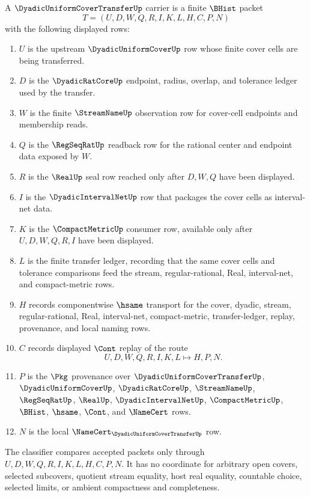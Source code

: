 \begin{definition}
\label{def:dyadic-uniform-cover-transfer-carrier}
A $\DyadicUniformCoverTransferUp$ carrier is a finite $\BHist$ packet
$$
T=(U,D,W,Q,R,I,K,L,H,C,P,N)
$$
with the following displayed rows:
\begin{enumerate}
\item $U$ is the upstream $\DyadicUniformCoverUp$ row whose finite cover cells are being transferred.
\item $D$ is the $\DyadicRatCoreUp$ endpoint, radius, overlap, and tolerance ledger used by the transfer.
\item $W$ is the finite $\StreamNameUp$ observation row for cover-cell endpoints and membership reads.
\item $Q$ is the $\RegSeqRatUp$ readback row for the rational center and endpoint data exposed by $W$.
\item $R$ is the $\RealUp$ seal row reached only after $D,W,Q$ have been displayed.
\item $I$ is the $\DyadicIntervalNetUp$ row that packages the cover cells as interval-net data.
\item $K$ is the $\CompactMetricUp$ consumer row, available only after $U,D,W,Q,R,I$ have been displayed.
\item $L$ is the finite transfer ledger, recording that the same cover cells and tolerance comparisons feed the stream, regular-rational, Real, interval-net, and compact-metric rows.
\item $H$ records componentwise $\hsame$ transport for the cover, dyadic, stream, regular-rational, Real, interval-net, compact-metric, transfer-ledger, replay, provenance, and local naming rows.
\item $C$ records displayed $\Cont$ replay of the route
$$
U,D,W,Q,R,I,K,L \longmapsto H,P,N .
$$
\item $P$ is the $\Pkg$ provenance over $\DyadicUniformCoverTransferUp$, $\DyadicUniformCoverUp$, $\DyadicRatCoreUp$, $\StreamNameUp$, $\RegSeqRatUp$, $\RealUp$, $\DyadicIntervalNetUp$, $\CompactMetricUp$, $\BHist$, $\hsame$, $\Cont$, and $\NameCert$ rows.
\item $N$ is the local $\NameCert_{\DyadicUniformCoverTransferUp}$ row.
\end{enumerate}
The classifier compares accepted packets only through $U,D,W,Q,R,I,K,L,H,C,P,N$. It has no coordinate for arbitrary open covers, selected subcovers, quotient stream equality, host real equality, countable choice, selected limits, or ambient compactness and completeness.
\end{definition}

